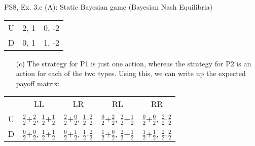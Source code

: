 \begin{frame}{PS8, Ex. 3.c (A): Static Bayesian game (Bayesian Nash Equilibria)}
\begin{multicols}{2}
\begin{table}
\begin{tabular}{l|c|c|}
          U & 2, 1 & 0, -2 \\\cline{2-3}
          D & 0, 1 & 1, -2 \\\cline{2-3}
        \end{tabular}
      \end{table}
      \vspace{-8pt}
      \begin{itemize}
          \item[(c)] The strategy for P1 is just one action, whereas the strategy for P2 is an action for each of the two types. Using this, we can write up the expected payoff matrix:
      \end{itemize}
      \vfill\null
    \end{multicols}
    \vspace{-20pt}
    \begin{table}
      \begin{tabular}{l|c|c|c|c|}
        \multicolumn{1}{c}{} & \multicolumn{1}{c}{LL} & \multicolumn{1}{c}{LR} & \multicolumn{1}{c}{RL} & \multicolumn{1}{c}{RR} \\\cline{2-5}
        U & $\frac{2}{2}$+$\frac{2}{2}$, $\frac{1}{2}$+$\frac{1}{2}$ & $\frac{2}{2}$+$\frac{0}{2}$, $\frac{1}{2}$-$\frac{2}{2}$ &
        $\frac{0}{2}$+$\frac{2}{2}$, $\frac{2}{2}$+$\frac{1}{2}$ & $\frac{0}{2}$+$\frac{0}{2}$, $\frac{2}{2}$-$\frac{2}{2}$ \\\cline{2-5}
        D & $\frac{0}{2}$+$\frac{0}{2}$, $\frac{1}{2}$+$\frac{1}{2}$ & $\frac{0}{2}$+$\frac{1}{2}$, $\frac{1}{2}$-$\frac{2}{2}$ &
        $\frac{1}{2}$+$\frac{0}{2}$, $\frac{2}{2}$+$\frac{1}{2}$ & $\frac{1}{2}$+$\frac{1}{2}$, $\frac{2}{2}$-$\frac{2}{2}$ \\\cline{2-5}
      \end{tabular}
    \end{table}
    \vfill\null
\end{frame}
